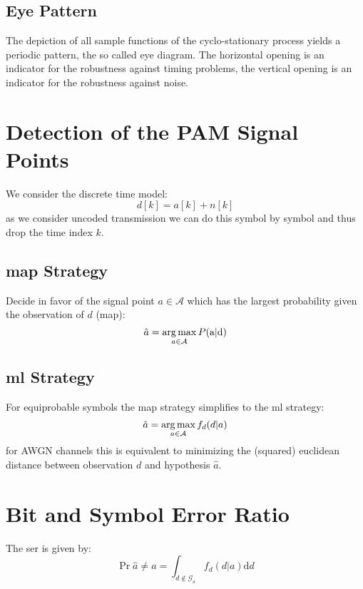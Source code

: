 \subsection{Eye Pattern}
The depiction of all sample functions of the cyclo-stationary process yields a periodic
pattern, the so called eye diagram. The horizontal opening is an indicator for the
robustness against timing problems, the vertical opening is an indicator for the robustness
against noise.

\section{Detection of the PAM Signal Points}
We consider the discrete time model:
\begin{equation}
    d[k] = a[k] + n[k]
\end{equation}
as we consider uncoded transmission we can do this symbol by symbol and thus drop the 
time index $k$.

\subsection{\acl{map} Strategy}
Decide in favor of the signal point $a \in \mathcal{A}$ which has the largest probability
given the observation of $d$ (\ac{map}):
\begin{equation}
    \hat{a} = \operatorname*{arg\,max}_{a\in \mathcal{A}} P(\text{a}|\text{d})
\end{equation}

\subsection{\acl{ml} Strategy}
For equiprobable symbols the \ac{map} strategy simplifies to the \ac{ml} strategy:
\begin{equation}
    \hat{a} = \operatorname*{arg\,max}_{a \in \mathcal{A}} f_d(d|a)
\end{equation}
for AWGN channels this is equivalent to minimizing the (squared) euclidean distance
between observation $d$ and hypothesis $\hat{a}$.

\section{Bit and Symbol Error Ratio}
The \ac{ser} is given by:
\begin{equation}
    \Pr{\hat{a} \neq a} = \int_{d \notin \mathcal{G}_a} f_d(d|a) \text{d}d
\end{equation}

